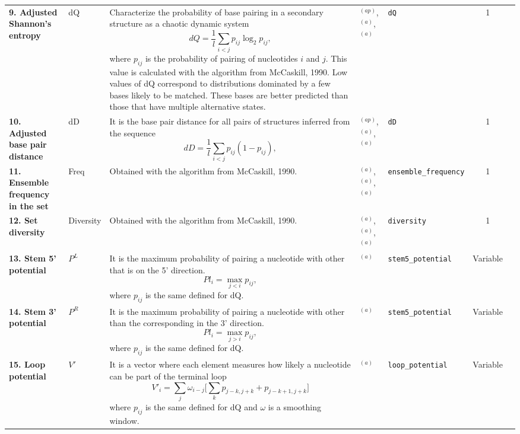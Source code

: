 \documentclass[a4paper,10pt]{article}
\begin{document}
\begin{longtable}{ >{\raggedright\arraybackslash}p{4.2cm}  p{1.6cm}  p{5.8cm}  p{1.8cm}  l  cp{1cm} }
\bfseries{9. Adjusted Shannon's entropy} & dQ & Characterize the probability of base pairing in a secondary structure as a chaotic dynamic system
$$ dQ = \frac{1}{l} \sum_{i<j} p_{ij} \log_2 p_{ij} , $$
where $p_{ij}$ is the probability of pairing of nucleotides $i$ and $j$. This value is calculated with the algorithm from McCaskill, 1990. Low values of dQ correspond to distributions dominated by a few bases likely to be matched. These bases are better predicted than those that have multiple alternative states. & \cite{KS07}$^{(ap)}$, \cite{RV09}$^{(a)}$, \cite{PM11}$^{(a)}$ & \verb|dQ| & 1 \\

\bfseries{10. Adjusted base pair distance} & dD & It is the base pair distance for all pairs of structures inferred from the sequence
$$ dD = \frac{1}{l} \sum_{i<j} p_{ij} (1 - p_{ij})  , $$
 & \cite{KS07}$^{(ap)}$, \cite{RV09}$^{(a)}$, \cite{PM11}$^{(a)}$ & \verb|dD| & 1 \\


\bfseries{11. Ensemble frequency in the set} & Freq & Obtained with the algorithm from  McCaskill, 1990. & \cite{RV09}$^{(a)}$, \cite{JS10}$^{(a)}$, \cite{PM11}$^{(a)}$ & \verb|ensemble_frequency| & 1 \\

\bfseries{12. Set diversity} & Diversity & Obtained with the algorithm from McCaskill, 1990. & \cite{RV09}$^{(a)}$, \cite{JS10}$^{(a)}$, \cite{PM11}$^{(a)}$ & \verb|diversity| & 1 \\

\bfseries{13. Stem 5' potential} & $P^L$ & It is the maximum probability of pairing a nucleotide with other that is on the 5' direction.
$$ Pl_i = \max_{j<i} p_{ij} , $$
where $p_{ij}$ is the same defined for dQ.
& \cite{GT07}$^{(a)}$ & \verb|stem5_potential| & Variable \\

\bfseries{14. Stem 3' potential} & $P^R$ & It is the maximum probability of pairing a nucleotide with other than the corresponding in the 3' direction.
$$ Pl_i = \max_{j>i} p_{ij} , $$
where $p_{ij}$ is the same defined for dQ. & \cite{GT07}$^{(a)}$ & \verb|stem5_potential| & Variable \\

\bfseries{15. Loop potential} & $V'$ & It is a vector where each element measures how likely a nucleotide can be part of the terminal loop
$$ V'_i = \sum_{j} \omega_{i-j} \Bigg[ \sum_{k} p_{j-k,j+k} + p_{j-k+1,j+k} \Bigg] $$
where $p_{ij}$ is the same defined for dQ and $\omega$ is a smoothing window. & \cite{GT07}$^{(a)}$ & \verb|loop_potential| & Variable \\

\end{longtable}
\end{document}

